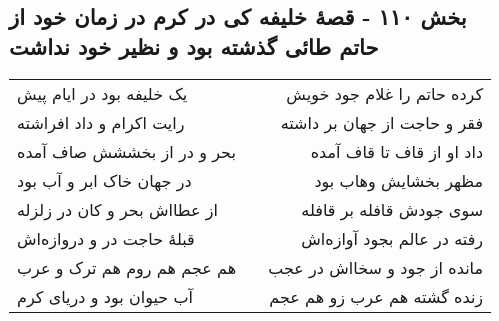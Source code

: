 \begin{center}
\section*{بخش ۱۱۰ - قصهٔ خلیفه کی در کرم در زمان خود از حاتم طائی گذشته بود و نظیر خود نداشت}
\label{sec:sh110}
\begin{longtable}{l p{0.5cm} r}
یک خلیفه بود در ایام پیش
&&
کرده حاتم را غلام جود خویش
\\
رایت اکرام و داد افراشته
&&
فقر و حاجت از جهان بر داشته
\\
بحر و در از بخششش صاف آمده
&&
داد او از قاف تا قاف آمده
\\
در جهان خاک ابر و آب بود
&&
مظهر بخشایش وهاب بود
\\
از عطااش بحر و کان در زلزله
&&
سوی جودش قافله بر قافله
\\
قبلهٔ حاجت در و دروازه‌اش
&&
رفته در عالم بجود آوازه‌اش
\\
هم عجم هم روم هم ترک و عرب
&&
مانده از جود و سخااش در عجب
\\
آب حیوان بود و دریای کرم
&&
زنده گشته هم عرب زو هم عجم
\\
\end{longtable}
\end{center}
